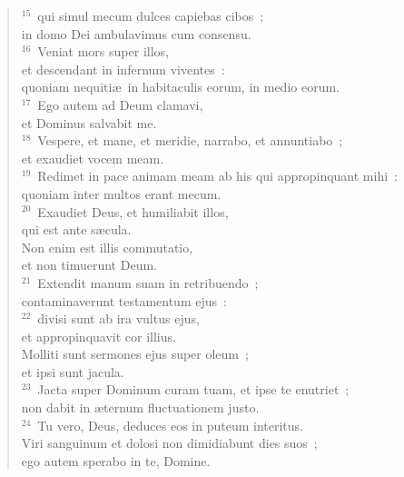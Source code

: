 \begin{flushleft}
\begin{verse}
${}^{15}$~qui simul mecum dulces capiebas cibos~;\\ in domo Dei ambulavimus cum consensu.\\
${}^{16}$~Veniat mors super illos,\\ et descendant in infernum viventes~:\\ quoniam nequiti\ae\ in habitaculis eorum, in medio eorum.\\
${}^{17}$~Ego autem ad Deum clamavi,\\ et Dominus salvabit me.\\
${}^{18}$~Vespere, et mane, et meridie, narrabo, et annuntiabo~;\\ et exaudiet vocem meam.\\
${}^{19}$~Redimet in pace animam meam ab his qui appropinquant mihi~:\\ quoniam inter multos erant mecum.\\
${}^{20}$~Exaudiet Deus, et humiliabit illos,\\ qui est ante s\ae cula.\\ Non enim est illis commutatio,\\ et non timuerunt Deum.\\
${}^{21}$~Extendit manum suam in retribuendo~;\\ contaminaverunt testamentum ejus~:\\
${}^{22}$~divisi sunt ab ira vultus ejus,\\ et appropinquavit cor illius.\\ Molliti sunt sermones ejus super oleum~;\\ et ipsi sunt jacula.\\
${}^{23}$~Jacta super Dominum curam tuam, et ipse te enutriet~;\\ non dabit in \ae ternum fluctuationem justo.\\
${}^{24}$~Tu vero, Deus, deduces eos in puteum interitus.\\ Viri sanguinum et dolosi non dimidiabunt dies suos~;\\ ego autem sperabo in te, Domine.\end{verse}\end{flushleft}



